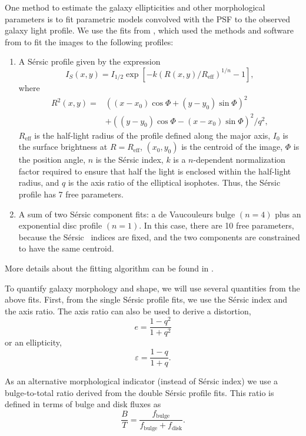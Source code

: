 \documentclass[twocolumn,useAMS,usenatbib]{mn2e}
\newcommand{\sersic}{S\'{e}rsic }
\begin{document}
One method to estimate the galaxy ellipticities and other
morphological parameters is to fit parametric models convolved with
the PSF to the observed galaxy light profile.  We use the fits from
\cite{great3}, which used the methods and
software from \cite{Claire_Fits} to fit the images to the following profiles:
\begin{enumerate}
 \item A \sersic profile given by the expression 
       \begin{equation} 
    I_S(x,y) = I_{1/2}\exp{\left[ -k(R(x,y)/R_{\text{eff}})^{1/n} -1 \right]},
       \end{equation}
where \begin{align*} R^2(x,y) = & ((x-x_0)\cos\Phi+(y-y_0)\sin\Phi)^2
  \\ & + ((y-y_0)\cos\Phi-(x-x_0)\sin\Phi)^2/q^2, \end{align*}
$R_{\text{eff}}$ is the half-light radius of the profile defined along
the major axis, $I_0$ is the surface brightness at $R=R_{\text{eff}}$, $(x_0,y_0)$ is the centroid of the image,
$\Phi$ is the position angle, $n$ is the \sersic index, $k$ is a
$n$-dependent normalization factor required to ensure that half the
light is enclosed within the half-light radius, and $q$ is the axis
ratio of the elliptical isophotes.
Thus, the \sersic profile has 7 free parameters.
       \item A sum of two \sersic component fits: a de Vaucouleurs
         bulge $(n=4)$ plus an exponential disc profile $(n=1)$.  In this
         case, there are 10 free parameters, because the \sersic\
         indices are fixed, and the two components are constrained to
         have the same centroid.
\end{enumerate}
More details about the fitting algorithm can be found
in \cite{Claire_Fits}.

To quantify galaxy morphology and shape, we will use several
quantities from the above fits.  First, from the single \sersic
profile fits, we use the \sersic index and the axis ratio.  The axis
ratio can also be used to derive a distortion,
\begin{equation}\label{eq:distortion}
e = \frac{1-q^2}{1+q^2}
\end{equation}
or an ellipticity,
\begin{equation}\label{eq:ellipticity}
\varepsilon = \frac{1-q}{1+q}.
\end{equation}

As an alternative morphological indicator (instead of \sersic index)
we use a bulge-to-total ratio derived from the double \sersic
profile fits.  This ratio is defined in terms of bulge and disk fluxes as
\begin{equation}
\frac{B}{T} = \frac{f_\text{bulge}}{f_\text{bulge}+f_\text{disk}}.
\end{equation}
 
\end{document}
